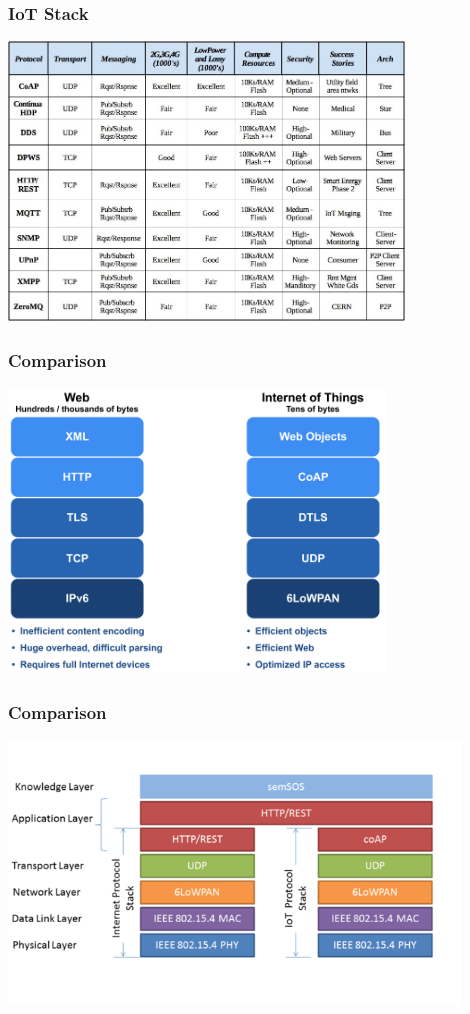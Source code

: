 \documentclass{beamer}
\begin{document}
\begin{frame}
	\frametitle{IoT Stack}
	\vspace{.25cm}
	\hspace*{.75cm} \includegraphics[width=10.5cm]{figs/iot-network-protocols.jpeg}
\end{frame}

\begin{frame}
	\frametitle{Comparison}
	\vspace{.5cm}
	\hspace*{1.5cm} \includegraphics[width=10cm]{figs/Web-and-IoT-Stacks-1.png}
\end{frame}

\begin{frame}
	\frametitle{Comparison}
	\vspace{.5cm}
	\hspace*{.5cm} \includegraphics[width=12cm]{figs/Web-and-IoT-Stacks-2.png}
\end{frame}
\end{document}
